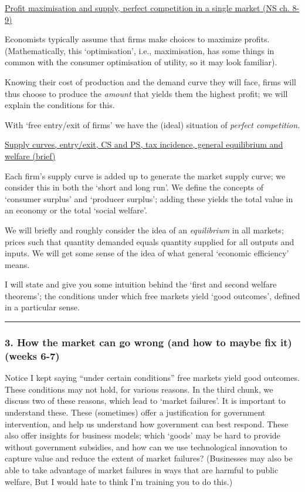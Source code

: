 \documentclass[]{article}
\begin{document}
\underline{Profit maximisation and supply, perfect competition in a single market (NS ch. 8-9)}

Economists typically assume that firms make choices to maximize profits.
(Mathematically, this `optimisation', i.e., maximisation, has some
things in common with the consumer optimisation of utility, so it may
look familiar).

Knowing their cost of production and the demand curve they will face,
firms will thus choose to produce the \emph{amount} that yields them the
highest profit; we will explain the conditions for this.

With `free entry/exit of firms' we have the (ideal) situation of
\emph{perfect competition}.

\underline{Supply curves, entry/exit, CS and PS, tax incidence, general equilibrium and welfare (brief)}

Each firm's supply curve is added up to generate the market supply
curve; we consider this in both the `short and long run'. We define the
concepts of `consumer surplus' and `producer surplus'; adding these
yields the total value in an economy or the total `social welfare'.

We will briefly and roughly consider the idea of an \emph{equilibrium}
in all markets; prices such that quantity demanded equals quantity
supplied for all outputs and inputs. We will get some sense of the idea
of what general `economic efficiency' means.

I will state and give you some intuition behind the `first and second
welfare theorems'; the conditions under which free markets yield `good
outcomes', defined in a particular sense.

\begin{center}\rule{0.5\linewidth}{\linethickness}\end{center}

\hypertarget{how-the-market-can-go-wrong-and-how-to-maybe-fix-it-weeks-6-7}{%
\subsubsection{3. How the market can go wrong (and how to maybe fix it)
(weeks
6-7)}\label{how-the-market-can-go-wrong-and-how-to-maybe-fix-it-weeks-6-7}}

Notice I kept saying ``under certain conditions'' free markets yield
good outcomes. These conditions may not hold, for various reasons. In
the third chunk, we discuss two of these reasons, which lead to `market
failures'. It is important to understand these. These (sometimes) offer
a justification for government intervention, and help us understand how
government can best respond. These also offer insights for business
models; which `goods' may be hard to provide without government
subsidies, and how can we use technological innovation to capture value
and reduce the extent of market failures? (Businesses may also be able
to take advantage of market failures in ways that are harmful to public
welfare, But I would hate to think I'm training you to do this.)
\end{document}

